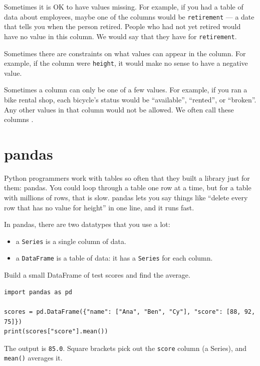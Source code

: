 Sometimes it is OK to have values missing.  For example, if you had a
table of data about employees, maybe one of the columns would be
\texttt{retirement} --- a date that tells you when the person retired.  People who
had not yet retired would have no value in this column.  We would say
that they have  for \texttt{retirement}.

Sometimes there are constraints on what values can appear in the
column.  For example, if the column were \texttt{height}, it would make no
sense to have a negative value.

Sometimes a column can only be one of a few values. For example, if
you ran a bike rental shop, each bicycle's status would be ``available'',
``rented'', or ``broken''.  Any other values in that column would not
be allowed.  We often call these columns .

\section{pandas}



Python programmers work with tables so often that they built a library
just for them: pandas. You could loop through a table one row at a time,
but for a table with millions of rows, that is slow. pandas lets you say
things like ``delete every row that has no value for height'' in one line,
and it runs fast.

In pandas, there are two datatypes that you use a lot:
\begin{itemize}
\item a \texttt{Series} is a single column of data.
\item a \texttt{DataFrame} is a table of data: it has a \texttt{Series} for each column.
\end{itemize}

\begin{Worked}
\begin{Problem}
Build a small DataFrame of test scores and find
the average.
\end{Problem}
\begin{Solution}
\begin{verbatim}
import pandas as pd

scores = pd.DataFrame({"name": ["Ana", "Ben", "Cy"], "score": [88, 92, 75]})
print(scores["score"].mean())
\end{verbatim}
The output is \texttt{85.0}. Square brackets pick out the
\texttt{score} column (a Series), and \texttt{mean()} averages
it.
\end{Solution}
\end{Worked}

